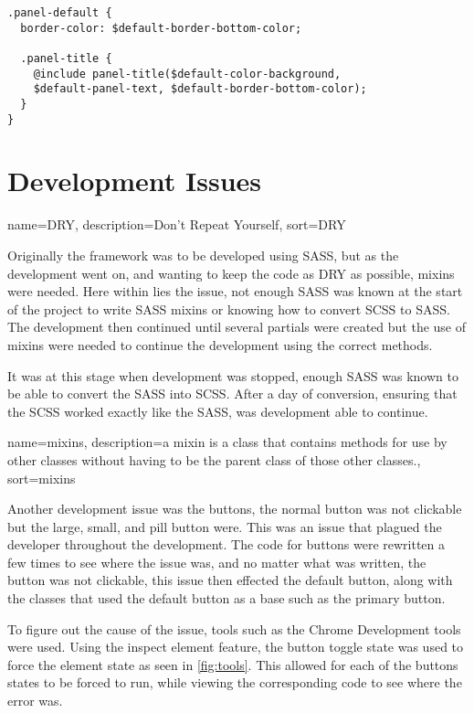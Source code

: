 \begin{lstlisting}[language=CSS3]
.panel-default {
  border-color: $default-border-bottom-color;

  .panel-title {
    @include panel-title($default-color-background, 
    $default-panel-text, $default-border-bottom-color);
  }
}
\end{lstlisting}

\newpage
\section*{Development Issues}

{
  name={DRY},
  description={Don't Repeat Yourself},
  sort=DRY
}

Originally the framework was to be developed using \gls{SASS}, but as the development went on, and wanting to keep the code as \gls{DRY} as possible, \gls{mixins} were needed. Here within lies the issue, not enough \gls{SASS} was known at the start of the project to write \gls{SASS} \gls{mixins} or knowing how to convert \gls{SCSS} to \gls{SASS}. The development then continued until several partials were created but the use of \gls{mixins} were needed to continue the development using the correct methods. 

It was at this stage when development was stopped, enough \gls{SASS} was known to be able to convert the \gls{SASS} into \gls{SCSS}. After a day of conversion, ensuring that the \gls{SCSS} worked exactly like the \gls{SASS}, was development able to continue. 

{
  name={mixins},
  description={a mixin is a class that contains methods for use by other classes without having to be the parent class of those other classes.},
  sort=mixins
}

Another development issue was the buttons, the normal button was not clickable but the large, small, and pill button were. This was an issue that plagued the developer throughout the development. The code for buttons were rewritten a few times to see where the issue was, and no matter what was written, the button was not clickable, this issue then effected the default button, along with the classes that used the default button as a base such as the primary button. 

To figure out the cause of the issue, tools such as the Chrome Development tools were used. Using the inspect element feature, the button toggle state was used to force the element state as seen in \ref{fig:tools}. This allowed for each of the buttons states to be forced to run, while viewing the corresponding code to see where the error was. 

